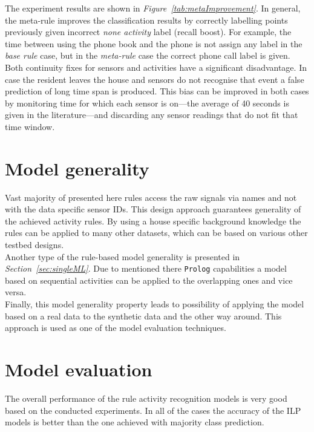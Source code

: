 \documentclass[10pt, a4paper, pdflatex, leqno, twoside, openright]{report}
\begin{document}
The experiment results are shown in \emph{Figure~\ref{tab:metaImprovement}}. In general, the meta-rule improves the classification results by correctly labelling points previously given incorrect \emph{none activity} label (recall boost). For example, the time between using the phone book and the phone is not assign any label in the \emph{base rule} case, but in the \emph{meta-rule} case the correct phone call label is given.\\

Both continuity fixes for sensors and activities have a significant disadvantage. In case the resident leaves the house and sensors do not recognise that event a false prediction of long time span is produced. This bias can be improved in both cases by monitoring time for which each sensor is on---the average of 40 seconds is given in the literature---and discarding any sensor readings that do not fit that time window.

  \section{Model generality}
Vast majority of presented here rules access the raw signals via names and not with the data specific sensor IDs. This design approach guarantees generality of the achieved activity rules. By using a house specific background knowledge the rules can be applied to many other datasets, which can be based on various other testbed designs.\\
Another type of the rule-based model generality is presented in \emph{Section~\ref{sec:singleML}}. Due to mentioned there \texttt{Prolog} capabilities a model based on sequential activities can be applied to the overlapping ones and vice versa.\\

Finally, this model generality property leads to possibility of applying the model based on a real data to the synthetic data and the other way around. This approach is used as one of the model evaluation techniques.

  \section{Model evaluation}
The overall performance of the rule activity recognition models is very good based on the conducted experiments. In all of the cases the accuracy of the ILP models is better than the one achieved with majority class prediction.\\
\end{document}
